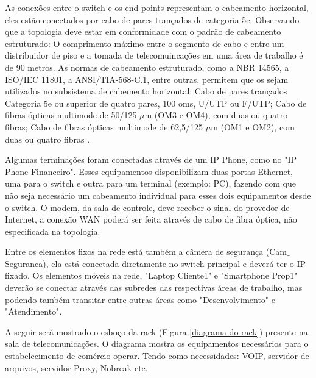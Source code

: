 \documentclass[	DIV=calc,%
							paper=a4,%
							fontsize=12pt,%
							onecolumn]{scrartcl}	 					%
\begin{document}
As conexões entre o switch e os end-points representam o cabeamento horizontal, eles estão conectados por cabo de pares trançados de categoria 5e. Observando que a topologia deve estar em conformidade com o padrão de cabeamento estruturado: 
O comprimento máximo entre o segmento de cabo e entre um distribuidor de piso e a tomada de telecomuincações em uma área de trabalho é de 90 metros. As normas de cabeamento estruturado, como a NBR 14565, a ISO/IEC 11801, a ANSI/TIA-568-C.1, entre outras, permitem que os sejam utilizados no subsistema de cabemento horizontal: Cabo de pares trançados Categoria 5e ou superior de quatro pares, 100 oms, U/UTP ou F/UTP; Cabo de fibras ópticas multimode de 50/125 $\mu$m (OM3 e OM4), com duas ou quatro fibras; Cabo de fibras ópticas multimode de 62,5/125 $\mu$m (OM1 e OM2), com duas ou quatro fibras \cite{marin2014cabeamento}.

Algumas terminações foram conectadas através de um IP Phone, como no "IP Phone Financeiro". Esses equipamentos disponibilizam duas portas Ethernet, uma para o switch e outra para um terminal (exemplo: PC), fazendo com que não seja necessário um cabeamento individual para esses dois equipamentos desde o switch. O modem, da sala de controle, deve receber o sinal do provedor de Internet, a conexão WAN poderá ser feita através de cabo de fibra óptica, não especificada na topologia.

Entre os elementos fixos na rede está também a câmera de segurança (Cam$\_$Seguranca), ela está conectada diretamente no switch principal e deverá ter o IP fixado. Os elementos móveis na rede, "Laptop Cliente1" e "Smartphone Prop1" deverão se conectar através das subredes das respectivas áreas de trabalho, mas podendo também transitar entre outras áreas como "Desenvolvimento" e "Atendimento".

A seguir será mostrado o esboço da rack (Figura \ref{diagrama-do-rack}) presente na sala de telecomunicações. O diagrama mostra os equipamentos necessários para o estabelecimento de comércio operar. Tendo como necessidades: VOIP, servidor de arquivos, servidor Proxy, Nobreak etc.
\end{document}
